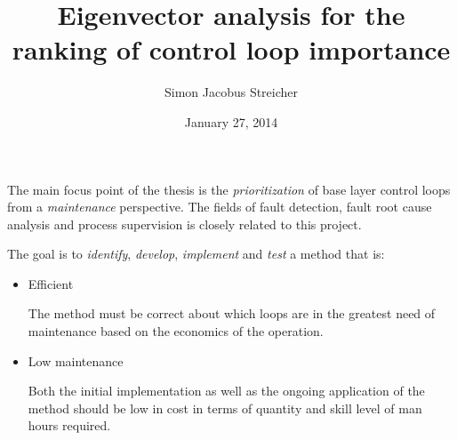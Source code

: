 \documentclass{article}
\newcommand{\subtitle}[1]{%
  \posttitle{%
    \par\end{center}
    \begin{center}\Large#1\end{center}
    \vskip0.5em}%
  }
\begin{document}


\title{Eigenvector analysis for the ranking of control loop importance}
\subtitle{One page summary}
\date{January 27, 2014}
\author{Simon Jacobus Streicher}
\maketitle
\thispagestyle{empty}





\newpage
{}
\pagestyle{fancy}


The main focus point of the thesis is the \textit{prioritization} of base layer control loops from a \textit{maintenance} perspective.
The fields of fault detection, fault root cause analysis and process supervision is closely related to this project.

The goal is to \textit{identify}, \textit{develop}, \textit{implement} and \textit{test} a method that is:

\begin{itemize}
\item Efficient

The method must be correct about which loops are in the greatest need of maintenance based on the economics of the operation.
\item Low maintenance

Both the initial implementation as well as the ongoing application of the method should be low in cost in terms of quantity and skill level of man hours required.
\end{itemize}
\end{document}

